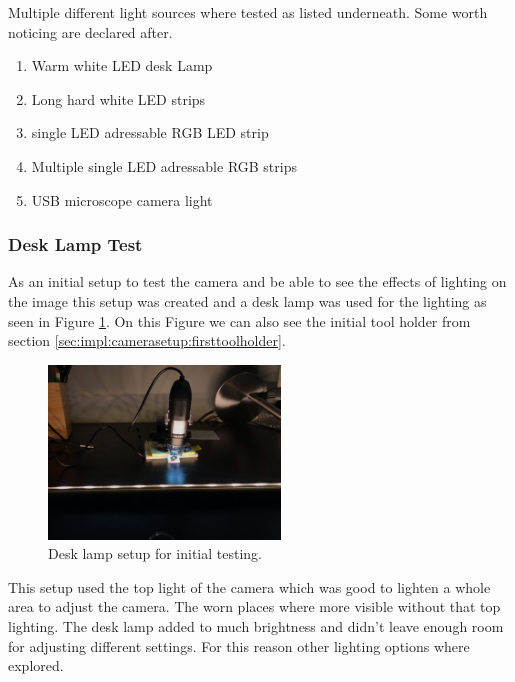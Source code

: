 	Multiple different light sources where tested as listed underneath. Some worth noticing are declared after.

		\begin{enumerate}
			\item Warm white LED desk Lamp
			\item Long hard white LED strips 
			\item single LED adressable RGB LED strip
			\item Multiple single LED adressable RGB strips
			\item USB microscope camera light
		\end{enumerate}
		
		\subsubsection{Desk Lamp Test}

			As an initial setup to test the camera and be able to see the effects of lighting on the image this setup was created and a desk lamp was used for the lighting as seen in Figure \ref{fig:setup:desklamp}. On this Figure we can also see the initial tool holder from section \ref{sec:impl:camerasetup:firsttoolholder}.

			\begin{figure}[hbtp]
				\centering
				\includegraphics[width=0.55\textwidth, keepaspectratio=true]{./fig/Camera_setup/Light/Desk_Lamp_Test/eerste_setup_andere_richting.jpeg}
				\caption{Desk lamp setup for initial testing.}
				\label{fig:setup:desklamp}
			\end{figure}

			This setup used the top light of the camera which was good to lighten a whole area to adjust the camera. The worn places where more visible without that top lighting. The desk lamp added to much brightness and didn't leave enough room for adjusting different settings. For this reason other lighting options where explored.


